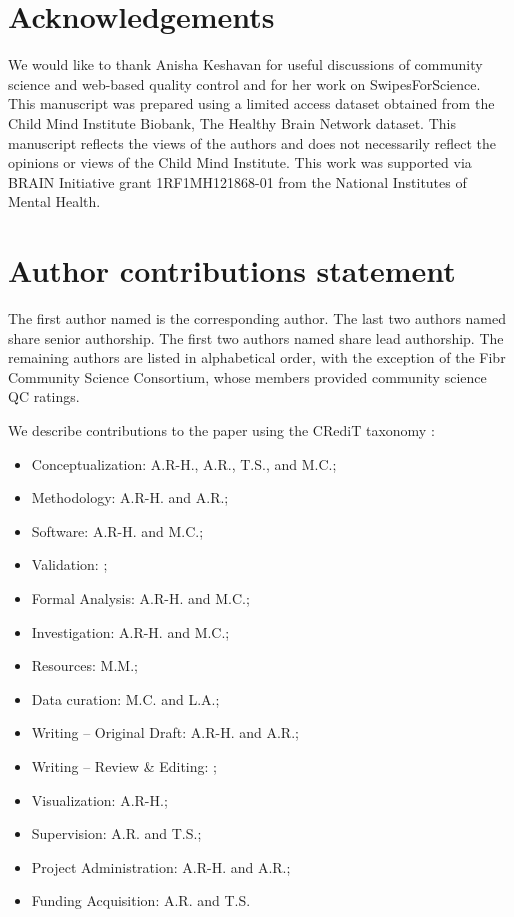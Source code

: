 \documentclass[fleqn,10pt]{wlscirep}
\begin{document}


\section*{Acknowledgements}

We would like to thank Anisha Keshavan for useful discussions of community
science and web-based quality control and for her work on SwipesForScience. This
manuscript was prepared using a limited access dataset obtained from the Child
Mind Institute Biobank, The Healthy Brain Network dataset. This manuscript
reflects the views of the authors and does not necessarily reflect the opinions
or views of the Child Mind Institute. This work was supported via BRAIN Initiative grant 1RF1MH121868-01 from the National Institutes of Mental Health.


\section*{Author contributions statement}

The first author named is the corresponding author. The last two authors named
share senior authorship. The first two authors named share lead authorship. The
remaining authors are listed in alphabetical order, with the exception of
the Fibr Community Science Consortium, whose members provided community science
QC ratings.


We describe contributions to the paper using the CRediT taxonomy \cite{brand2015-vd,allen2014-oc}:
\begin{itemize}
    \item Conceptualization: A.R-H., A.R., T.S., and M.C.;
    \item Methodology: A.R-H. and A.R.;
    \item Software: A.R-H. and M.C.;
    \item Validation: ;
    \item Formal Analysis: A.R-H. and M.C.;
    \item Investigation: A.R-H. and M.C.;
    \item Resources: M.M.;
    \item Data curation: M.C. and L.A.;
    \item Writing – Original Draft: A.R-H. and A.R.;
    \item Writing – Review \& Editing: ;
    \item Visualization: A.R-H.;
    \item Supervision: A.R. and T.S.;
    \item Project Administration: A.R-H. and A.R.;
    \item Funding Acquisition: A.R. and T.S.
\end{itemize}
\end{document}
